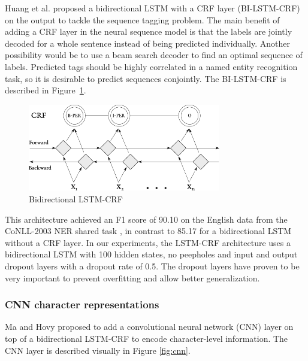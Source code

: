 \documentclass{nle}
\begin{document}
Huang et al.  proposed a bidirectional LSTM with a CRF layer (BI-LSTM-CRF) on 
the output to tackle the sequence tagging problem. The main benefit of adding a CRF layer 
in the neural sequence model is that the labels are jointly decoded for a whole sentence 
instead of being predicted individually. Another possibility would be to use a beam search
decoder to find an optimal sequence of labels. Predicted tags should be highly correlated 
in a named entity recognition task, so it is desirable to predict sequences conjointly.
The BI-LSTM-CRF is described in Figure~\ref{fig:bi_lstm_crf}.

\begin{figure}[h]
  \centering
  \includegraphics[width=0.75\textwidth]{pics/bi_lstm_crf}
  \caption{Bidirectional LSTM-CRF}
  \label{fig:bi_lstm_crf}
\end{figure}

This architecture achieved an F1 score of 90.10 on the English data from the CoNLL-2003 
NER shared task \cite{Sang2003}, in contrast to 85.17 for a bidirectional LSTM without 
a CRF layer. 
In our experiments, the LSTM-CRF architecture uses a bidirectional LSTM with 100 
hidden states, no peepholes and input and output dropout layers with a dropout
rate of 0.5. The dropout layers have proven to be very important to prevent overfitting 
and allow better generalization.

\subsubsection{CNN character representations}
\label{sssec:lstm_crf_cnn}

Ma and Hovy  proposed to add a convolutional neural network (CNN) layer 
on top of a bidirectional LSTM-CRF to encode character-level information. The CNN
layer is described visually in Figure \ref{fig:cnn}.
\end{document}
